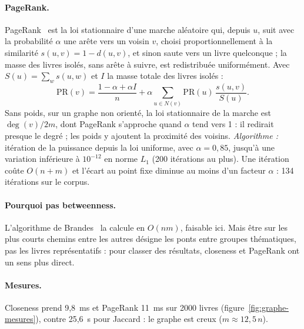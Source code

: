 \paragraph{PageRank.} PageRank~\cite{brin} est la loi stationnaire d'une marche
aléatoire qui, depuis $u$, suit avec la probabilité $\alpha$ une arête vers un
voisin $v$, choisi proportionnellement à la similarité $s(u, v) = 1 - d(u, v)$,
et sinon saute vers un livre quelconque ; la masse des livres isolés, sans arête
à suivre, est redistribuée uniformément. Avec
$S(u) = \sum_w s(u, w)$ et $I$ la masse totale des livres isolés :
\[
  \mathrm{PR}(v) = \frac{1 - \alpha + \alpha I}{n}
  + \alpha \sum_{u \in N(v)} \mathrm{PR}(u)\, \frac{s(u, v)}{S(u)}.
\]
Sans poids, sur un graphe non orienté, la loi stationnaire de la marche est
$\deg(v)/2m$, dont PageRank s'approche quand $\alpha$ tend vers 1 : il redirait
presque le degré ; les poids y ajoutent la proximité des voisins.
\emph{Algorithme :} itération de la puissance depuis la loi uniforme, avec
$\alpha = 0{,}85$, jusqu'à une variation inférieure à $10^{-12}$ en norme $L_1$
(200 itérations au plus). Une itération coûte $O(n + m)$ et l'écart au point
fixe diminue au moins d'un facteur $\alpha$ : 134 itérations sur le corpus.

\paragraph{Pourquoi pas betweenness.} L'algorithme de Brandes~\cite{brandes} la
calcule en $O(nm)$, faisable ici. Mais être sur les plus courts chemins entre
les autres désigne les ponts entre groupes thématiques, pas les livres
représentatifs : pour classer des résultats, closeness et PageRank ont un sens
plus direct.

\paragraph{Mesures.} Closeness prend 9,8~ms et PageRank 11~ms sur 2000 livres
(figure~\ref{fig:graphe-mesures}), contre 25,6~s pour Jaccard : le graphe est
creux ($m \approx 12{,}5\,n$).


